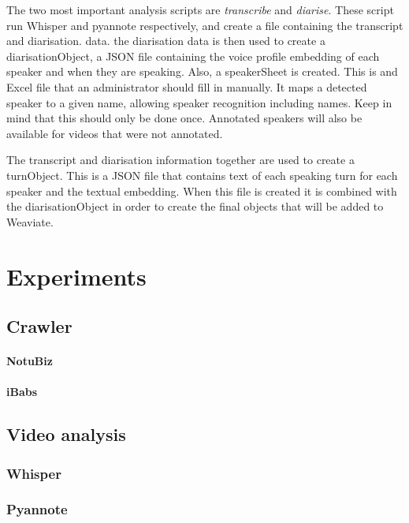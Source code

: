 \documentclass[twoside]{uva-inf-bachelor-thesis}
\begin{document}
The two most important analysis scripts are \textit{transcribe} and \textit{diarise}. These script run Whisper and pyannote respectively, and create a file containing the transcript and diarisation. data. the diarisation data is then used to create a diarisationObject, a JSON file containing the voice profile embedding of each speaker and when they are speaking. Also, a speakerSheet is created. This is and Excel file that an administrator should fill in manually. It maps a detected speaker to a given name, allowing speaker recognition including names. Keep in mind that this should only be done once. Annotated speakers will also be available for videos that were not annotated.

The transcript and diarisation information together are used to create a turnObject. This is a JSON file that contains text of each speaking turn for each speaker and the textual embedding. When this file is created it is combined with the diarisationObject in order to create the final objects that will be added to Weaviate.


\chapter{Experiments}
\section{Crawler}
\subsubsection{NotuBiz}

\subsubsection{iBabs}


\section{Video analysis}
\subsection{Whisper}

\subsection{Pyannote}
\end{document}
